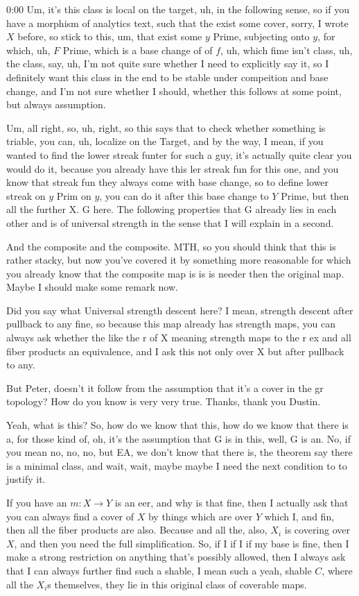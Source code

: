 \begin{unfinished}{0:00}
Um, it's this class is local on the target, uh, in the following sense, so if you have a morphism of analytics text, such that the exist some cover, sorry, I wrote $X$ before, so stick to this, um, that exist some $y$ Prime, subjecting onto $y$, for which, uh, $F$ Prime, which is a base change of of $f$, uh, which fime isn't class, uh, the class, say, uh, I'm not quite sure whether I need to explicitly say it, so I definitely want this class in the end to be stable under compeition and base change, and I'm not sure whether I should, whether this follows at some point, but always assumption.

Um, all right, so, uh, right, so this says that to check whether something is triable, you can, uh, localize on the Target, and by the way, I mean, if you wanted to find the lower streak funter for such a guy, it's actually quite clear you would do it, because you already have this ler streak fun for this one, and you know that streak fun they always come with base change, so to define lower streak on $y$ Prim on $y$, you can do it after this base change to $Y$ Prime, but then all the further
X. G here. The following properties that G already lies in each other and is of universal strength in the sense that I will explain in a second.

And the composite and the composite. MTH, so you should think that this is rather stacky, but now you've covered it by something more reasonable for which you already know that the composite map is is is needer then the original map. Maybe I should make some remark now.

Did you say what Universal strength descent here? I mean, strength descent after pullback to any fine, so because this map already has strength maps, you can always ask whether the like the r of X meaning strength maps to the r ex and all fiber products an equivalence, and I ask this not only over X but after pullback to any.

But Peter, doesn't it follow from the assumption that it's a cover in the gr topology? How do you know is very very true. Thanks, thank you Dustin.

Yeah, what is this? So, how do we know that this, how do we know that there is a, for those kind of, oh, it's the assumption that G is in this, well, G is an. No, if you mean no, no, no, but EA, we don't know that there is, the theorem say there is a minimal class, and wait, wait, maybe maybe I need the next condition to to justify it.

If you have an $m: X \to Y$ is an eer, and why is that fine, then I actually ask that you can always find a cover of $X$ by things which are over $Y$ which I, and fin, then all the fiber products are also. Because and all the, also, $X_i$ is covering over $X$, and then you need the full simplification. So, if I if I if my base is fine, then I make a strong restriction on anything that's possibly allowed, then I always ask that I can always further find such a shable, I mean such a yeah, shable $C$, where all the $X_i$s themselves, they lie in this original class of coverable maps.


\end{unfinished}
